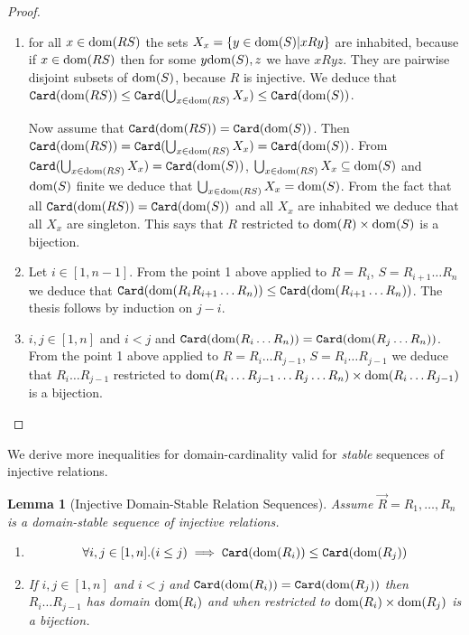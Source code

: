 \documentclass{lmcs}
\newtheorem{lemma}[theorem]{Lemma}
\begin{document}
\begin{proof}
\begin{enumerate}

\item
for all $x \in {\rm dom}(RS)$ the sets $X_x = \{ y \in {\rm dom}(S) | x R y \}$ are inhabited,
because if $x \in {\rm dom}(RS)$ then for some $y {\rm dom}(S), z$ we have $x R y z$.
They are pairwise disjoint subsets of ${\rm dom}(S)$, because $R$ is injective. We deduce that 
${\tt Card}({\rm dom}(RS)) \le {\tt Card}(\bigcup_{x \in {\rm dom}(RS)} X_x) \le {\tt Card}({\rm dom}(S))$.

Now assume that ${\tt Card}({\rm dom}(RS)) = {\tt Card}({\rm dom}(S))$. Then 
${\tt Card}({\rm dom}(RS)) = {\tt Card}(\bigcup_{x \in {\rm dom}(RS)} X_x) = {\tt Card}({\rm dom}(S))$. 
From ${\tt Card}(\bigcup_{x \in {\rm dom}(RS)} X_x) = {\tt Card}({\rm dom}(S))$, 
$\bigcup_{x \in {\rm dom}(RS)} X_x \subseteq {\rm dom}(S)$ and ${\rm dom}(S)$ finite we deduce
that $\bigcup_{x \in {\rm dom}(RS)} X_x = {\rm dom}(S)$. 
From the fact that all ${\tt Card}({\rm dom}(RS)) = {\tt Card}({\rm dom}(S))$ and all $X_x$ are inhabited we 
deduce that all $X_x$ are singleton. This says that $R$ restricted to ${\rm dom}(R) \times {\rm dom}(S)$
is a bijection.

\item
Let $i \in [1,n-1]$.
From the point 1 above applied to $R = R_i$, $S = R_{i+1}\ldots R_n$ we deduce that
${\tt Card}({\rm dom}(R_i R_{i+1}\ldots R_n)) \le {\tt Card}({\rm dom}(R_{i+1} \ldots R_n))$. The thesis
follows by induction on $j-i$.

\item
$i, j \in[1,n]$ and $i < j$ and ${\tt Card}({\rm dom}(R_i \ldots R_n)) = {\tt Card}({\rm dom}(R_j \ldots R_n))$.
From the point 1 above applied to $R = R_i \ldots R_{j-1}$, $S = R_i \ldots R_{j-1}$ 
we deduce that $R_i \ldots R_{j-1}$ restricted to 
${\rm dom}(R_i \ldots R_{j-1} \ldots R_j \ldots R_n) \times {\rm dom}(R_i \ldots R_{j-1})$
is a bijection.

\end{enumerate}
\end{proof}

We derive more inequalities for domain-cardinality
valid for \emph{stable} sequences of injective relations. 


\begin{lemma}[Injective Domain-Stable Relation Sequences]
\label{lemma-injective-stable-sequences}
Assume $\vec{R}=R_1, \ldots, R_n$ is a \emph{domain-stable}
sequence of \emph{injective} relations.
\begin{enumerate}

\item
\label{lemma-injective-stable-sequences-01}
$$
\forall i,j \in [1,n]. (i \le j) \implies {\tt Card}({\rm dom}(R_i)) \le {\tt Card}({\rm dom}(R_j))
$$

\item
\label{lemma-injective-stable-sequences-02}
If  $i, j \in[1,n]$ and $i < j$ and ${\tt Card}({\rm dom}(R_i)) = {\tt Card}({\rm dom}(R_j))$
then $R_i \ldots R_{j-1}$ has domain ${\rm dom}(R_i)$ and
when restricted to ${\rm dom}(R_i) \times {\rm dom}(R_j)$
is a bijection.
\end{enumerate}
\end{lemma}
\end{document}
